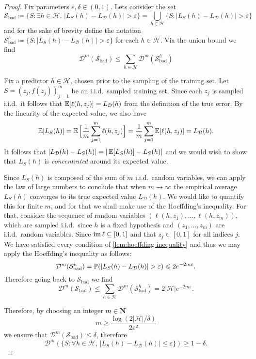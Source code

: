 \begin{proof}
    Fix parameters \(\varepsilon, \delta \in (0, 1)\). Lets consider the set
    \[
        \mathcal{S}_{\text{bad}} \coloneq
        \{S \colon \exists h \in \mathcal{H},\, |L_S(h) - L_{\mathcal{D}}(h)| > \varepsilon\}
        = \bigcup_{h \in \mathcal{H}} \{S \colon |L_S(h) - L_{\mathcal{D}}(h)| > \varepsilon\}
    \]
    and for the sake of brevity define the notation
    \(\mathcal{S}_{\text{bad}}^h \coloneq \{S \colon |L_S(h) - L_{\mathcal{D}}(h)| >
    \varepsilon\}\) for each \(h \in \mathcal{H}\). Via the union bound we find
    \[
        \mathcal{D}^m(\mathcal{S}_{\text{bad}})
        \leq \sum_{h \in \mathcal{H}} \mathcal{D}^m(\mathcal{S}_{\text{bad}}^h)
    \]

    Fix a predictor \(h \in \mathcal{H}\), chosen prior to the sampling of the
    training set. Let \(S = (z_j, f(z_j))_{j=1}^m\) be an i.i.d.~sampled training
    set. Since each \(z_j\) is sampled i.i.d.~it follows that
    \(\operatorname{\mathbb{E}}[\ell(h, z_j)] = L_{\mathcal{D}}(h)\) from the definition of the true
    error. By the linearity of the expected value, we also have
    \[
        \operatorname{\mathbb{E}}[L_S(h)] = \operatorname{\mathbb{E}}\Big[ \frac{1}{m} \sum_{j=1}^m \ell(h, z_j) \Big]
        = \frac{1}{m} \sum_{j=1}^m \operatorname{\mathbb{E}}[\ell(h, z_j)]
        =  L_{\mathcal{D}}(h).
    \]
    It follows that \(|L_{\mathcal{D}}(h) - L_S(h)| = |\operatorname{\mathbb{E}}[L_S(h)] - L_S(h)|\)
    and we would wish to show that \(L_S(h)\) is \emph{concentrated} around its
    expected value.

    Since \(L_S(h)\) is composed of the sum of \(m\) i.i.d.~random variables, we can
    apply the law of large numbers to conclude that when \(m \to \infty\) the
    empirical average \(L_S(h)\) converges to its true expected value
    \(L_{\mathcal{D}}(h)\). We would like to quantify this for finite \(m\), and for
    that we shall make use of the Hoeffding's inequality. For that, consider the
    sequence of random variables \((\ell(h, z_1), \dots, \ell(h, z_m))\), which are
    sampled i.i.d.~since \(h\) is a fixed hypothesis and \((z_1, \dots, z_m)\) are
    i.i.d.~random variables. Since \(\operatorname{im} \ell \subseteq [0, 1]\) and that
    \(z_j \in [0, 1]\) for all indices \(j\). We have satisfied every condition of
    \cref{lem:hoeffding-inequality} and thus we may apply the Hoeffding's inequality
    as follows:
    \[
        \mathcal{D}^m(\mathcal{S}_{\text{bad}}^h)
        = \operatorname{\mathbb{P}}(|L_S(h) - L_{\mathcal{D}}(h)| > \varepsilon)
        \leqslant 2 e^{-2 m \varepsilon}.
    \]
    Therefore going back to \(\mathcal{S}_{\text{bad}}\) we find
    \[
        \mathcal{D}^m(\mathcal{S}_{\text{bad}})
        \leq \sum_{h \in \mathcal{H}} \mathcal{D}^m(\mathcal{S}_{\text{bad}}^{h})
        = 2 |\mathcal{H}| e^{-2 m \varepsilon}.
    \]

    Therefore, by choosing an integer \(m \in \mathbf{N}\)
    \[
        m \geq \frac{\log(2 |\mathcal{H}| / \delta)}{2 \varepsilon^2}
    \]
    we ensure that \(\mathcal{D}^m(\mathcal{S}_{\text{bad}}) \leq \delta\),
    therefore
    \[
        \mathcal{D}^m(\{S \colon \forall h \in \mathcal{H},\,
        |L_S(h) - L_{\mathcal{D}}(h)| \leq \varepsilon\}) \geq 1 - \delta.
    \]
\end{proof}

